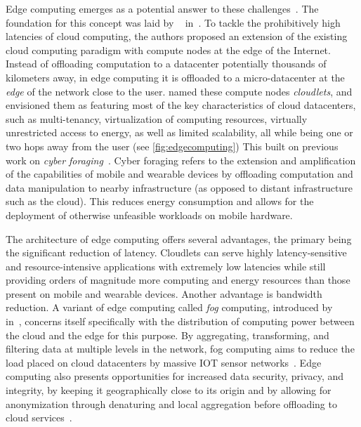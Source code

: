 \medskip
Edge computing emerges as a potential answer to these challenges~\cite{satyanarayanan2009case,shi2016promise,shi2016edge,varghese2016challenges,satyanarayanan2017emergence,bittmann2017edge,wang2019towards}.
The foundation for this concept was laid by \citeauthor{satyanarayanan2009case}~\cite{satyanarayanan2009case} in\ \citeyear{satyanarayanan2009case}.
To tackle the prohibitively high latencies of cloud computing, the authors proposed an extension of the existing cloud computing paradigm with compute nodes at the edge of the Internet.
Instead of offloading computation to a datacenter potentially thousands of kilometers away, in edge computing it is offloaded to a micro-datacenter at the \emph{edge} of the network close to the user.
\citeauthor{satyanarayanan2009case} named these compute nodes \emph{cloudlets}, and envisioned them as featuring most of the key characteristics of cloud datacenters, such as multi-tenancy, virtualization of computing resources, virtually unrestricted access to energy, as well as limited scalability, all while being one or two hops away from the user (see \cref{fig:edgecomputing})
This built on previous work on \emph{cyber foraging}~\cite{noble1997agile,flinn1999energy,satyanarayanan2001pervasive}.
Cyber foraging refers to the extension and amplification of the capabilities of mobile and wearable devices by offloading computation and data manipulation to nearby infrastructure (as opposed to distant infrastructure such as the cloud).
This reduces energy consumption and allows for the deployment of otherwise unfeasible workloads on mobile hardware.

The architecture of edge computing offers several advantages, the primary being the significant reduction of latency.
Cloudlets can serve highly latency-sensitive and resource-intensive applications with extremely low latencies while still providing orders of magnitude more computing and energy resources than those present on mobile and wearable devices.
Another advantage is bandwidth reduction.
A variant of edge computing called \emph{fog} computing, introduced by \citeauthor{bonomi2012fog}~\cite{bonomi2012fog} in\ \citeyear{bonomi2012fog}, concerns itself specifically with the distribution of computing power between the cloud and the edge for this purpose.
By aggregating, transforming, and filtering data at multiple levels in the network, fog computing aims to reduce the load placed on cloud datacenters by massive \gls{IOT} sensor networks~\cite{yi2015survey}.
Edge computing also presents opportunities for increased data security, privacy, and integrity, by keeping it geographically close to its origin and by allowing for anonymization through denaturing and local aggregation before offloading to cloud services~\cite{satyanarayanan2017emergence}.

